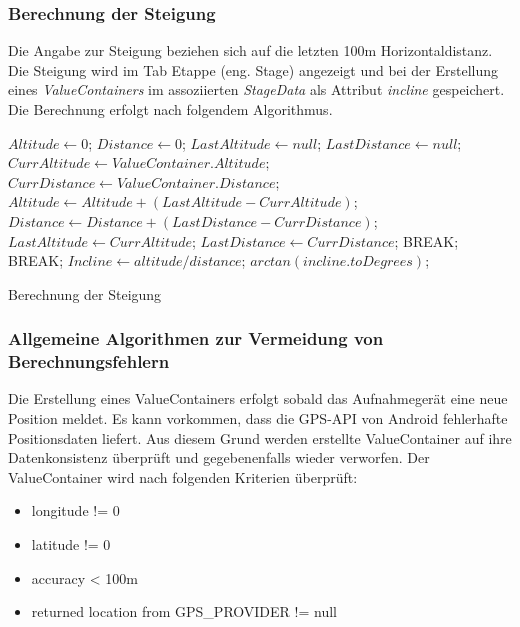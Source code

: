 \subsubsection{Berechnung der Steigung}
Die Angabe zur Steigung beziehen sich auf die letzten 100m Horizontaldistanz. Die Steigung wird im Tab Etappe (eng. Stage) angezeigt und bei der Erstellung eines \textit{ValueContainers} im assoziierten \textit{StageData} als Attribut \textit{incline} gespeichert. Die Berechnung erfolgt nach folgendem Algorithmus.


\begin{algorithm}[H]
\begin{algorithmic}[1]
\vspace{5pt}
\State $Altitude \gets 0$;
\State $Distance \gets 0$;
\State $LastAltitude \gets null$;
\State $LastDistance \gets null$;
\State $CurrAltitude \gets ValueContainer.Altitude$;
\State $CurrDistance \gets ValueContainer.Distance$;
\State $Altitude \gets Altitude + (LastAltitude - CurrAltitude)$;
\State $Distance \gets Distance + (LastDistance - CurrDistance)$;
\EndIf
\State $LastAltitude \gets CurrAltitude$;
\State $LastDistance \gets CurrDistance$;
\State BREAK;
\EndIf
\Else
\State BREAK;
\EndIf
\EndFor
\State $Incline \gets altitude/distance$;
\State \Return $arctan(incline.toDegrees)$;
\end{algorithmic}
\caption{Berechnung der Steigung}
\end{algorithm}

\subsubsection{Allgemeine Algorithmen zur Vermeidung von Berechnungsfehlern}
Die Erstellung eines ValueContainers erfolgt sobald das Aufnahmegerät eine neue Position meldet. Es kann vorkommen, dass die GPS-API von Android fehlerhafte Positionsdaten liefert. Aus diesem Grund werden erstellte ValueContainer auf ihre Datenkonsistenz überprüft und gegebenenfalls wieder verworfen. Der ValueContainer wird nach folgenden Kriterien überprüft:
\begin{itemize} [noitemsep,topsep=0pt]
\item longitude != 0
\item latitude != 0
\item accuracy < 100m
\item returned location from GPS\_PROVIDER != null
\end{itemize}

